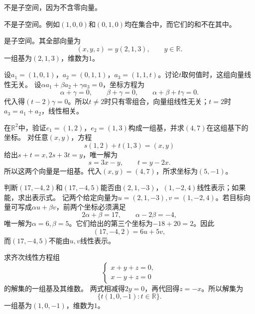 不是子空间，因为不含零向量。

不是子空间。例如\((1,0,0)\)和\((0,1,0)\)均在集合中，而它们的和不在其中。

是子空间。其全部向量为
\[
(x,y,z)=y(2,1,3),\qquad y\in\mathbb R.
\]
一组基为\((2,1,3)\)，维数为\(1\)。


设\(a_{1} = \left( 1 , 0 , 1 \right)\)，\(a_{2} = \left( 0 , 1 , 1 \right)\)，\(a_{3} = \left( 1 , 1 , t \right)\)。讨论\(t\)取何值时，这组向量线性无关。
\solutionanswer
设\(\alpha a_1+\beta a_2+\gamma a_3=0\)，坐标方程为
\[
\alpha+\gamma=0,\qquad \beta+\gamma=0,\qquad
\alpha+\beta+t\gamma=0.
\]
代入得\((t-2)\gamma=0\)。所以\(t\ne2\)时只有零组合，向量组线性无关；\(t=2\)时\(a_3=a_1+a_2\)，线性相关。


在\(\mathbb{R}^{2}\)中，验证\(e_{1} = \left( 1 , 2 \right)\)，\(e_{2} = \left( 1 , 3 \right)\)构成一组基，并求\(\left( 4 , 7 \right)\)在这组基下的坐标。
\solutionanswer
对任意\((x,y)\)，方程
\[
s(1,2)+t(1,3)=(x,y)
\]
给出\(s+t=x,2s+3t=y\)，唯一解为
\[
s=3x-y,\qquad t=y-2x.
\]
所以这两个向量是一组基。代入\((x,y)=(4,7)\)，所求坐标为\((5,-1)\)。


判断\(\left( 17 , - 4 , 2 \right)\)和\(\left( 17 , - 4 , 5 \right)\)能否由\(\left( 2 , 1 , - 3 \right)\)，\(\left( 1 , - 2 , 4 \right)\)线性表示；如果能，求出表示式。
\solutionanswer
记两个给定向量为\(u=(2,1,-3),v=(1,-2,4)\)。若目标向量可写成\(\alpha u+\beta v\)，前两个坐标必须满足
\[
2\alpha+\beta=17,\qquad \alpha-2\beta=-4,
\]
唯一解为\(\alpha=6,\beta=5\)。它们给出的第三个坐标为\(-18+20=2\)。因此
\[
(17,-4,2)=6u+5v,
\]
而\((17,-4,5)\)不能由\(u,v\)线性表示。


求齐次线性方程组
\begin{equation*}
    \left\{ \begin{matrix}x + y + z = 0 , \\ x - y + z = 0\end{matrix} \right.
\end{equation*}
的解集的一组基及其维数。
\solutionanswer
两式相减得\(2y=0\)，再代回得\(z=-x\)。所以解集为
\[
\{t(1,0,-1):t\in\mathbb R\}.
\]
一组基为\((1,0,-1)\)，维数为\(1\)。


